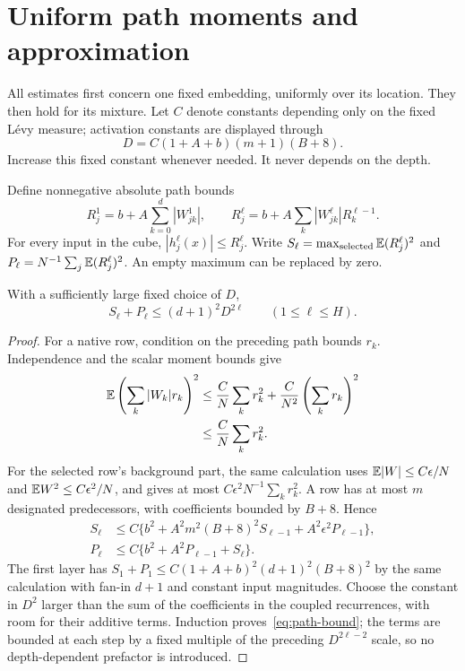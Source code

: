 \section{Uniform path moments and approximation}
\label{sec:moments}
All estimates first concern one fixed embedding, uniformly over its location. They then hold for its mixture. Let $C$ denote constants depending only on the fixed L\'evy measure; activation constants are displayed through
\[
 D=C(1+A+b)(m+1)(B+8).
\]
Increase this fixed constant whenever needed. It never depends on the depth.

Define nonnegative absolute path bounds
\[
 R_j^1=b+A\sum_{k=0}^d|W_{jk}^1|,\qquad
 R_j^\ell=b+A\sum_k|W_{jk}^\ell|R_k^{\ell-1}.
\]
For every input in the cube, $|h_j^\ell(x)|\le R_j^\ell$. Write
$S_\ell=\max_{\rm selected}\mathbb E(R_j^\ell)^2$ and
$P_\ell=N^{-1}\sum_j\mathbb E(R_j^\ell)^2$.
An empty maximum can be replaced by zero.

\begin{lemma}\label{lem:path}
With a sufficiently large fixed choice of $D$,
\begin{equation}
 S_\ell+P_\ell\le(d+1)^2D^{2\ell}
 \qquad(1\le\ell\le H).
 \label{eq:path-bound}
\end{equation}
\end{lemma}
\begin{proof}
For a native row, condition on the preceding path bounds $r_k$. Independence and the scalar moment bounds give
\begin{align*}
 \mathbb E\left(\sum_k|W_k|r_k\right)^2
 &\le\frac{C}{N}\sum_k r_k^2
       +\frac{C}{N^2}\left(\sum_k r_k\right)^2\\
 &\le\frac{C}{N}\sum_k r_k^2.
\end{align*}
For the selected row's background part, the same calculation uses
$\mathbb E|W|\le C\epsilon/N$ and $\mathbb E W^2\le C\epsilon^2/N$, and gives at most
$C\epsilon^2N^{-1}\sum_k r_k^2$.
A row has at most $m$ designated predecessors, with coefficients bounded by $B+8$. Hence
\begin{align}
 S_\ell&\le C\{b^2+A^2m^2(B+8)^2S_{\ell-1}
                         +A^2\epsilon^2P_{\ell-1}\},\\
 P_\ell&\le C\{b^2+A^2P_{\ell-1}+S_\ell\}.
 \label{eq:path-recursion}
\end{align}
The first layer has
$S_1+P_1\le C(1+A+b)^2(d+1)^2(B+8)^2$ by the same calculation with fan-in $d+1$ and constant input magnitudes. Choose the constant in $D^2$ larger than the sum of the coefficients in the coupled recurrences, with room for their additive terms. Induction proves~\eqref{eq:path-bound}; the terms are bounded at each step by a fixed multiple of the preceding $D^{2\ell-2}$ scale, so no depth-dependent prefactor is introduced.
\end{proof}

